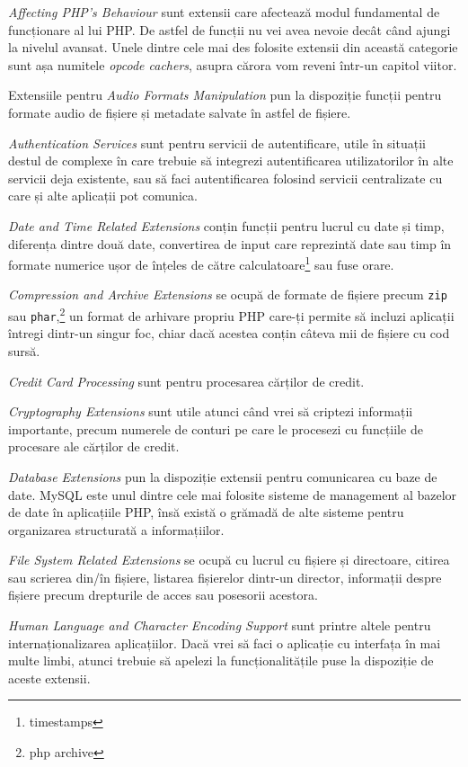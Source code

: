 \textit{Affecting PHP's Behaviour} sunt extensii care afectează
modul fundamental de funcționare al lui PHP. De astfel de funcții
nu vei avea nevoie decât când ajungi la nivelul avansat. Unele
dintre cele mai des folosite extensii din această categorie sunt
așa numitele \textit{opcode cachers},
asupra cărora vom reveni într-un capitol viitor.

Extensiile pentru \textit{Audio Formats Manipulation} pun
la dispoziție funcții pentru formate audio de fișiere și metadate
salvate în astfel de fișiere.

\textit{Authentication Services} sunt pentru servicii de autentificare,
utile în situații destul de complexe în care trebuie să integrezi
autentificarea utilizatorilor în alte servicii deja existente, sau să
faci autentificarea folosind servicii centralizate cu care și alte aplicații pot
comunica.

\textit{Date and Time Related Extensions} conțin funcții pentru
lucrul cu date și timp, diferența dintre două date, convertirea
de input care reprezintă date sau timp în formate numerice ușor
de înțeles de către calculatoare\footnote{timestamps} sau fuse orare.

\textit{Compression and Archive Extensions} se ocupă de formate
de fișiere precum \texttt{zip} sau \texttt{phar},\footnote{php archive}
un format de arhivare propriu PHP care-ți permite să incluzi aplicații
întregi dintr-un singur foc, chiar dacă acestea conțin câteva mii
de fișiere cu cod sursă.

\textit{Credit Card Processing} sunt pentru procesarea cărților de credit.

\textit{Cryptography Extensions} sunt utile atunci când vrei să
criptezi informații importante, precum numerele de conturi pe care le
procesezi cu funcțiile de procesare ale cărților de credit.

\textit{Database Extensions} pun la dispoziție extensii pentru
comunicarea cu baze de date. MySQL este unul dintre cele mai folosite
sisteme de management al bazelor de date în aplicațiile
PHP, însă există o grămadă de alte sisteme pentru organizarea
structurată a informațiilor.

\textit{File System Related Extensions} se ocupă cu lucrul cu
fișiere și directoare, citirea sau scrierea din/în fișiere,
listarea fișierelor dintr-un director, informații despre fișiere
precum drepturile de acces sau posesorii acestora.

\textit{Human Language and Character Encoding Support} sunt
printre altele pentru internaționalizarea aplicațiilor.
Dacă vrei să faci o aplicație cu interfața în mai multe
limbi, atunci trebuie să apelezi la funcționalitățile
puse la dispoziție de aceste extensii.

